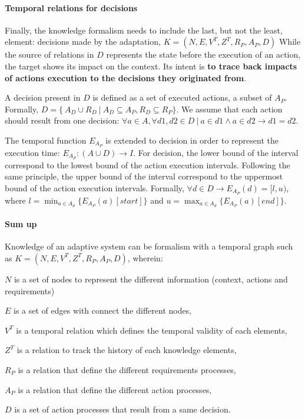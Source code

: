 \paragraph{Temporal relations for decisions}
Finally, the knowledge formalism needs to include the last, but not the least, element: decisions made by the adaptation, $K = (N, E, V^T, Z^T, R_P, A_P, D)$
While the source of relations in $D$ represents the state before the execution of an action, the target shows its impact on the \gls{context}. 
Its intent is \textbf{to trace back impacts of actions execution to the decisions they originated from}.  

A decision present in ${D}$ is defined as a set of executed actions, \ie a subset of ${A_P}$.
Formally, ${D} = \{\ {A_D \cup R_D}~|~{A_D}  \subseteq A_P, R_D \subseteq R_P\}$.
We assume that each action should result from one decision: $\forall a \in {A}, \forall d1, d2 \in {D}~|~a \in d1 \wedge a \in d2 \rightarrow d1 = d2$.

The temporal function $E_{A_P}$ is extended to decision in order to represent the execution time: $E_{A_P}: (A \cup D) \rightarrow I$.
For decision, the lower bound of the interval correspond to the lowest bound of the action execution intervals.
Following the same principle, the upper bound of the interval correspond to the uppermost bound of the action execution intervals.
Formally, $\forall d \in D \rightarrow E_{A_P}(d) = [l,u)$, where $l = \displaystyle \min_{a \in A_d} \{E_{A_P}(a)[start]\}$ and $u = \displaystyle \max_{a \in A_d} \{E_{A_P}(a)[end]\}$.

\paragraph{Sum up}
Knowledge of an adaptive system can be formalism with a temporal graph such as $K = (N, E, V^T, Z^T, R_P, A_P, D)$, wherein:
\begin{condItemize}
	\item $N$ is a set of nodes to represent the different information (context, actions and requirements)
	\item $E$ is a set of edges with connect the different nodes,
	\item $V^T$ is a temporal relation which defines the temporal validity of each elements,
	\item $Z^T$ is a relation to track the history of each knowledge elements,
	\item $R_P$ is a relation that define the different requirements processes,
	\item $A_P$ is a relation that define the different action processes,
	\item $D$ is a set of action processes that result from a same decision.
\end{condItemize}

